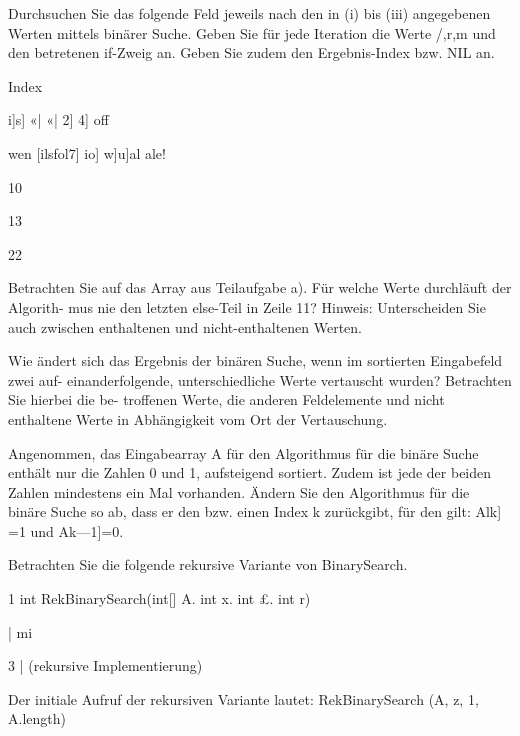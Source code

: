 \documentclass{lehramt-informatik-aufgabe}
\begin{document}
\begin{liAntwort}


\item Durchsuchen Sie das folgende Feld jeweils nach den in (i) bis
(iii) angegebenen Werten mittels binärer Suche. Geben Sie für jede
Iteration die Werte /,r,m und den betretenen if-Zweig an. Geben Sie
zudem den Ergebnis-Index bzw. NIL an.

Index

i]s] «| «| 2] 4] off

wen [ilsfol7] io] w]u]al ale!

\item 10

\item 13

\item 22


\item Betrachten Sie auf das Array aus Teilaufgabe a). Für welche Werte
durchläuft der Algorith- mus nie den letzten else-Teil in Zeile 11?
Hinweis: Unterscheiden Sie auch zwischen enthaltenen und
nicht-enthaltenen Werten.


\item Wie ändert sich das Ergebnis der binären Suche, wenn im sortierten
Eingabefeld zwei auf-
einanderfolgende, unterschiedliche Werte vertauscht wurden? Betrachten Sie hierbei die be-
troffenen Werte, die anderen Feldelemente und nicht enthaltene Werte in Abhängigkeit vom
Ort der Vertauschung.


\item Angenommen, das Eingabearray A für den Algorithmus für die binäre
Suche enthält nur die Zahlen 0 und 1, aufsteigend sortiert. Zudem ist
jede der beiden Zahlen mindestens ein Mal vorhanden. Ändern Sie den
Algorithmus für die binäre Suche so ab, dass er den bzw. einen Index k
zurückgibt, für den gilt: Alk] =1 und Ak—1]=0.


\item Betrachten Sie die folgende rekursive Variante von BinarySearch.

1 int RekBinarySearch(int[] A. int x. int £. int r)

| mi

3 | (rekursive Implementierung)

Der initiale Aufruf der rekursiven Variante lautet:
RekBinarySearch (A, z, 1, A.length)
\end{liAntwort}
\end{document}
